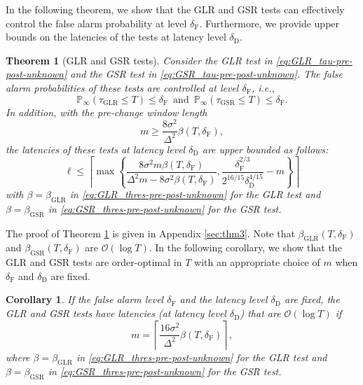 \documentclass[12pt]{interact}
\newcommand{\lp}{\left(}
\newcommand{\rp}{\right)}
\newcommand{\lbp}{\left\{}
\newcommand{\rbp}{\right\}}
\newcommand{\mcal}{\mathcal}
\newcommand{\mrm}{\mathrm}
\newcommand{\lce}{\left\lceil}
\newcommand{\rce}{\right\rceil}
\renewcommand{\Pr}{\mathbb{P}}
\theoremstyle{plain}
\newtheorem{theorem}{Theorem}
\newtheorem{corollary}{Corollary}
\begin{document}
In the following theorem, we show that the GLR and GSR tests can effectively control the false alarm probability at level $\delta_{\mathrm{F}}$. Furthermore, we provide upper bounds on the latencies of the tests at latency level $\delta_{\mathrm{D}}$.
%
\begin{theorem} [GLR and GSR tests] \label{thm:latency_pre-post-unknown}
Consider the GLR test in \eqref{eq:GLR_tau-pre-post-unknown} and the GSR test in \eqref{eq:GSR_tau-pre-post-unknown}. The false alarm probabilities of these tests are controlled at level $\delta_{\mrm{F}}$, i.e.,
%
\begin{equation}\label{FA_pre-post-unknown}
    \Pr_{\infty} \lp \tau_{\mrm{GLR}} \leq T \rp \leq \delta_{\mrm{F}} \enspace\mrm{and}\enspace \Pr_{\infty} \lp \tau_{\mrm{GSR}} \leq T \rp \leq \delta_{\mrm{F}}.
\end{equation}
%
In addition, with the pre-change window length
%
\begin{equation} \label{eq:m}
m \geq \frac{8\sigma^{2}}{\Delta^{2}}\beta \lp T,\delta_{\mrm{F}}\rp,
\end{equation}
%
the latencies of these tests at latency level $\delta_{\mathrm{D}}$ are upper bounded as follows:
%
\begin{equation} \label{eq:d}
  \ell\leq\lce\max\lbp\frac{8\sigma^{2}m\beta \lp T,\delta_{\mrm{F}}\rp}{\Delta^{2}m-8\sigma^{2}\beta \lp T,\delta_{\mrm{F}}\rp},\frac{\delta_{\mrm{F}}^{2/3}}{2^{16/15}\delta_{\mrm{D}}^{4/15}}-m\rbp\rce
\end{equation}
%
with $\beta = \beta_{\mrm{GLR}}$ in \eqref{eq:GLR_thres-pre-post-unknown}
for the GLR test and $\beta = \beta_{\mrm{GSR}}$ in \eqref{eq:GSR_thres-pre-post-unknown} for the GSR test.
\end{theorem}

The proof of Theorem \ref{thm:latency_pre-post-unknown} is given in Appendix \ref{sec:thm3}. Note that $\beta_{\mrm{GLR}} \lp T,\delta_{\mrm{F}}\rp$ and $\beta_{\mrm{GSR}} \lp T,\delta_{\mrm{F}}\rp$ are $\mcal{O} \lp \log T \rp$. In the following corollary, we show that the GLR and GSR tests are order-optimal in $T$ with %
an appropriate choice of $m$ when $\delta_{\mrm{F}}$ and $\delta_{\mrm{D}}$ are fixed.
%
\begin{corollary} \label{cor:m.d}
If the false alarm level $\delta_{\mrm{F}}$ and the latency level $\delta_{\mrm{D}}$ are fixed, the GLR and GSR tests have latencies (at latency level $\delta_{\mrm{D}}$) that are $\mcal{O} \lp \log T \rp$ if
%
\begin{equation}
    m = \lce \frac{16\sigma^{2}}{\Delta^{2}}\beta \lp T,\delta_{\mrm{F}}\rp\rce,
\end{equation}
%
where $\beta = \beta_{\mrm{GLR}}$ in \eqref{eq:GLR_thres-pre-post-unknown}
for the GLR test and $\beta = \beta_{\mrm{GSR}}$ in \eqref{eq:GSR_thres-pre-post-unknown} for the GSR test.
\end{corollary}
\end{document}
